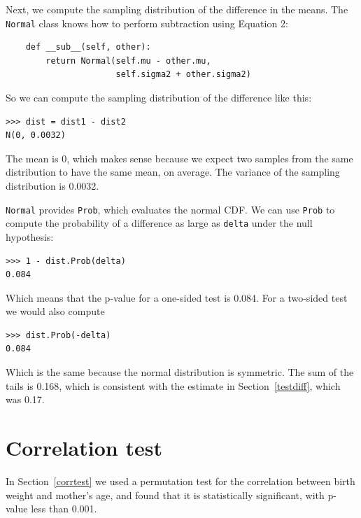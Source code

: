 \documentclass[12pt]{book}
\begin{document}
Next, we compute the sampling distribution of the difference
in the means.  The \verb"Normal" class knows how to perform
subtraction using Equation 2:

\begin{verbatim}
    def __sub__(self, other):
        return Normal(self.mu - other.mu,
                      self.sigma2 + other.sigma2)
\end{verbatim}

So we can compute the sampling distribution of the difference like this:

\begin{verbatim}
>>> dist = dist1 - dist2
N(0, 0.0032)
\end{verbatim}

The mean is 0, which makes sense because we expect two samples from
the same distribution to have the same mean, on average.  The variance
of the sampling distribution is 0.0032.

\verb"Normal" provides \verb"Prob", which evaluates the normal CDF.
We can use \verb"Prob" to compute the probability of a
difference as large as \verb"delta" under the null hypothesis:

\begin{verbatim}
>>> 1 - dist.Prob(delta)
0.084
\end{verbatim}

Which means that the p-value for a one-sided test is 0.084.  For
a two-sided test we would also compute

\begin{verbatim}
>>> dist.Prob(-delta)
0.084
\end{verbatim}

Which is the same because the normal distribution is symmetric.
The sum of the tails is 0.168, which is consistent with the estimate
in Section~\ref{testdiff}, which was 0.17.



\section{Correlation test}

In Section~\ref{corrtest} we used a permutation test for the correlation
between birth weight and mother's age, and found that it is
statistically significant, with p-value less than 0.001.
   
\end{document}
